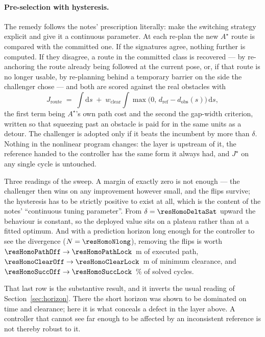 \documentclass[11pt,a4paper]{article}
\newcommand{\astar}{$A^\star$}
\begin{document}
\paragraph{Pre-selection with hysteresis.}
The remedy follows the notes' prescription literally: make the switching strategy explicit and give it a
continuous parameter. At each re-plan the new \astar{} route is compared with the committed one. If the
signatures agree, nothing further is computed. If they disagree, a route in the committed class is recovered
--- by re-anchoring the route already being followed at the current pose, or, if that route is no longer
usable, by re-planning behind a temporary barrier on the side the challenger chose --- and both are scored
against the real obstacles with
%
\begin{equation}
  J_{\text{route}} \;=\; \int \mathrm{d}s \;+\; w_{\text{clear}} \int \max\!\big(0,\, d_{\text{ref}} -
  d_{\text{obs}}(s)\big)\,\mathrm{d}s ,
  \label{eq:routescore}
\end{equation}
%
the first term being \astar{}'s own path cost and the second the gap-width criterion, written so that
squeezing past an obstacle is paid for in the same units as a detour. The challenger is adopted only if it
beats the incumbent by more than $\delta$. Nothing in the nonlinear program changes: the layer is upstream of
it, the reference handed to the controller has the same form it always had, and $J^\star$ on any single cycle
is untouched.


Three readings of the sweep. A margin of exactly zero is not enough --- the challenger then wins on any
improvement however small, and the flips survive; the hysteresis has to be strictly positive to exist at all,
which is the content of the notes' ``continuous tuning parameter''. From $\delta=\resHomoDeltaSat$ upward the
behaviour is constant, so the deployed value sits on a plateau rather than at a fitted optimum. And with a
prediction horizon long enough for the controller to see the divergence
($N=\resHomoNlong$), removing the flips is worth $\resHomoPathOff \to \resHomoPathLock$~m of executed path,
$\resHomoClearOff \to \resHomoClearLock$~m of minimum clearance, and $\resHomoSuccOff \to
\resHomoSuccLock$~\% of solved cycles.

That last row is the substantive result, and it inverts the usual reading of Section~\ref{sec:horizon}. There
the short horizon was shown to be dominated on time and clearance; here it is what conceals a defect in the
layer above. A controller that cannot see far enough to be affected by an inconsistent reference is not
thereby robust to it.
\end{document}
